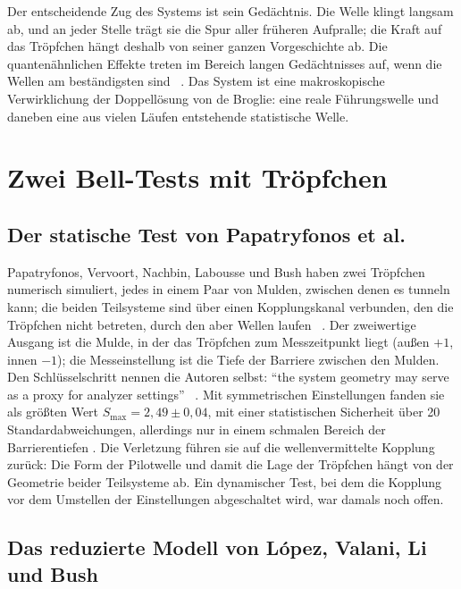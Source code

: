 Der entscheidende Zug des Systems ist sein Gedächtnis. Die Welle klingt langsam ab, und an jeder
Stelle trägt sie die Spur aller früheren Aufpralle; die Kraft auf das Tröpfchen hängt deshalb von
seiner ganzen Vorgeschichte ab. Die quantenähnlichen Effekte treten im Bereich langen Gedächtnisses
auf, wenn die Wellen am beständigsten sind \QM~\cite{Lopez2026}. Das System ist eine makroskopische
Verwirklichung der Doppellösung von de Broglie: eine reale Führungswelle und daneben eine aus
vielen Läufen entstehende statistische Welle.

\section{Zwei Bell-Tests mit Tröpfchen}

\subsection{Der statische Test von Papatryfonos et al.}

Papatryfonos, Vervoort, Nachbin, Labousse und Bush haben zwei Tröpfchen numerisch simuliert, jedes in
einem Paar von Mulden, zwischen denen es tunneln kann; die beiden Teilsysteme sind über einen
Kopplungskanal verbunden, den die Tröpfchen nicht betreten, durch den aber Wellen laufen
\QM~\cite{Papatryfonos2023}. Der zweiwertige Ausgang ist die Mulde, in der das Tröpfchen zum
Messzeitpunkt liegt (außen $+1$, innen $-1$); die Messeinstellung ist die Tiefe der Barriere
zwischen den Mulden. Den Schlüsselschritt nennen die Autoren selbst: \enquote{the system geometry may
serve as a proxy for analyzer settings} \QM~\cite{Papatryfonos2023}. Mit symmetrischen Einstellungen
fanden sie als größten Wert $S_{\max}=2{,}49\pm0{,}04$, mit einer statistischen Sicherheit über 20
Standardabweichungen, allerdings nur in einem schmalen Bereich der Barrierentiefen \QM. Die
Verletzung führen sie auf die wellenvermittelte Kopplung zurück: Die Form der Pilotwelle und damit
die Lage der Tröpfchen hängt von der Geometrie beider Teilsysteme ab. Ein dynamischer Test, bei dem
die Kopplung vor dem Umstellen der Einstellungen abgeschaltet wird, war damals noch offen.

\subsection{Das reduzierte Modell von López, Valani, Li und Bush}

